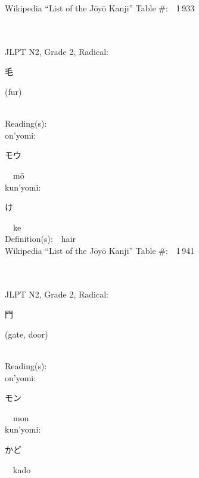 \begin{multicols}{2}
Wikipedia ``List of the J\=oy\=o Kanji'' Table \#:\ \ 1\,933 \\
\ \ \\
{\fontsize{34pt}{40pt}  }\ \ \\  %
{JLPT N2, Grade 2, Radical:\ \ {\begin{CJK}{UTF8}{min} 毛 \end{CJK}} (fur) } \\
Reading(s):\ \ \\
{\hspace*{1em}}on'yomi:\ \ \\
{\hspace*{2em}}{\begin{CJK}{UTF8}{min} モウ \end{CJK}}\ \ m\=o\ \ \\
{\hspace*{1em}}kun'yomi:\ \ \\
{\hspace*{2em}}{\begin{CJK}{UTF8}{min} け \end{CJK}}\ \ ke\ \ \\
Definition(s):\ \ hair \\
Wikipedia ``List of the J\=oy\=o Kanji'' Table \#:\ \ 1\,941 \\
\ \ \\
{\fontsize{34pt}{40pt}  }\ \ \\  %
{JLPT N2, Grade 2, Radical:\ \ {\begin{CJK}{UTF8}{min} 門 \end{CJK}} (gate, door) } \\
Reading(s):\ \ \\
{\hspace*{1em}}on'yomi:\ \ \\
{\hspace*{2em}}{\begin{CJK}{UTF8}{min} モン \end{CJK}}\ \ mon\ \ \\
{\hspace*{1em}}kun'yomi:\ \ \\
{\hspace*{2em}}{\begin{CJK}{UTF8}{min} かど \end{CJK}}\ \ kado\ \ \\

\end{multicols}
